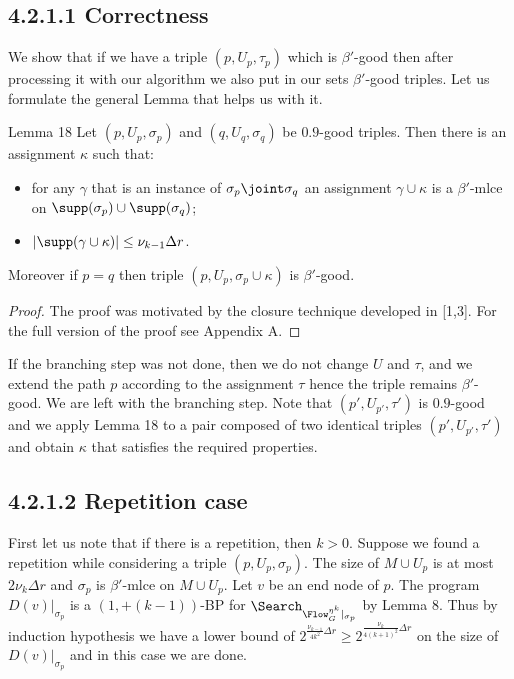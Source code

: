 \subsection*{4.2.1.1 Correctness}
We show that if we have a triple $(p,U_p,\tau_p)$ which is $\beta'$-good then after processing it with our algorithm we also put in our sets $\beta'$-good triples. Let us formulate the general Lemma that helps us with it.
\begin{result}{Lemma 18}
Let $(p,U_p,\sigma_p)$ and $(q,U_q,\sigma_q)$ be $0.9$-good triples. Then there is an assignment $\kappa$ such that:
\begin{itemize}\item for any $\gamma$ that is an instance of $\sigma_p\joint\sigma_q$ an assignment $\gamma\cup\kappa$ is a $\beta'$-mlce on $\supp(\sigma_p)\cup\supp(\sigma_q)$;
\item $|\supp(\gamma\cup\kappa)|\le\nu_{k-1}\Delta r$.\end{itemize}
Moreover if $p=q$ then triple $(p,U_p,\sigma_p\cup\kappa)$ is $\beta'$-good.
\end{result}
\begin{proof}
The proof was motivated by the closure technique developed in [1,3]. For the full version of the proof see Appendix A.
\end{proof}
If the branching step was not done, then we do not change $U$ and $\tau$, and we extend the path $p$ according to the assignment $\tau$ hence the triple remains $\beta'$-good. We are left with the branching step. Note that $(p',U_{p'},\tau')$ is $0.9$-good and we apply Lemma 18 to a pair composed of two identical triples $(p',U_{p'},\tau')$ and obtain $\kappa$ that satisfies the required properties.
\subsection*{4.2.1.2 Repetition case}
First let us note that if there is a repetition, then $k>0$. Suppose we found a repetition while considering a triple $(p,U_p,\sigma_p)$. The size of $M\cup U_p$ is at most $2\nu_k\Delta r$ and $\sigma_p$ is $\beta'$-mlce on $M\cup U_p$. Let $v$ be an end node of $p$. The program $D(v)|_{\sigma_p}$ is a $(1,+(k-1))$-BP for $\Search_{\Flow_G^{\eta^k}|_{\sigma_p}}$ by Lemma 8. Thus by induction hypothesis we have a lower bound of $2^{\frac{\nu_{k-1}}{4k^2}\Delta r}\ge2^{\frac{\nu_k}{4(k+1)^2}\Delta r}$ on the size of $D(v)|_{\sigma_p}$ and in this case we are done.
